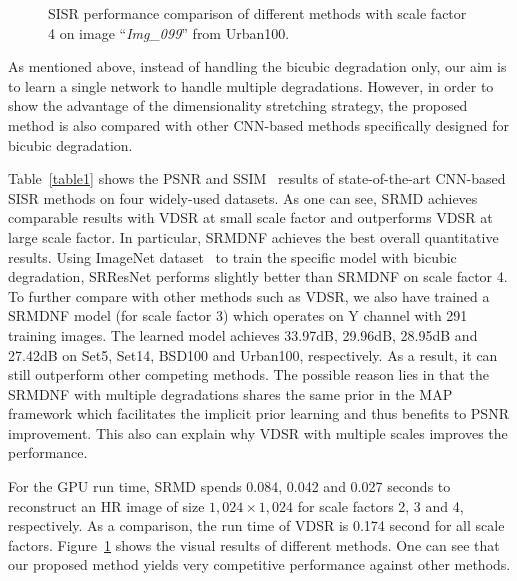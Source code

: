 \documentclass[10pt,twocolumn,letterpaper]{article}
\begin{document}
\begin{figure}[!t]
{\begin{center}
\hspace{0.1cm}
\caption{SISR performance comparison of different methods with scale factor 4 on image ``\emph{Img\_099}'' from Urban100.}\label{fig_bicubic1}
\end{center}}\vspace{-0.4cm}
\end{figure}



As mentioned above, instead of handling the bicubic degradation only, our aim is to learn a single network to handle multiple degradations. However, in order to show the advantage of the dimensionality stretching strategy, the proposed method is also compared with other CNN-based methods specifically designed for bicubic degradation.


Table~\ref{table1} shows the PSNR and SSIM~\cite{wang2004image} results of state-of-the-art CNN-based SISR methods on four widely-used datasets.
As one can see, SRMD achieves comparable results with VDSR at small scale factor and outperforms VDSR at large scale factor.
In particular, SRMDNF achieves the best overall quantitative results.
Using ImageNet dataset~\cite{krizhevsky2012imagenet} to train the specific model with bicubic degradation, SRResNet performs slightly better than SRMDNF on scale factor 4.
To further compare with other methods such as VDSR, we also have trained a SRMDNF model (for scale factor 3) which operates on Y channel with 291 training images.
The learned model achieves 33.97dB, 29.96dB, 28.95dB and 27.42dB on Set5, Set14, BSD100 and Urban100, respectively. As a result,
it can still outperform other competing methods. The possible reason lies in that the SRMDNF with multiple degradations shares
the same prior in the MAP framework which facilitates the
implicit prior learning and thus benefits to PSNR improvement.
This also can explain why VDSR with multiple scales improves the performance.


For the GPU run time, SRMD spends 0.084, 0.042 and 0.027 seconds to reconstruct an HR image of size $1,024\times1,024$ for scale factors 2, 3 and 4, respectively.
As a comparison, the run time of VDSR is 0.174 second for all scale factors.
Figure~\ref{fig_bicubic1} shows the visual results of different methods.
One can see that our proposed method yields very competitive performance against other methods.
\end{document}
